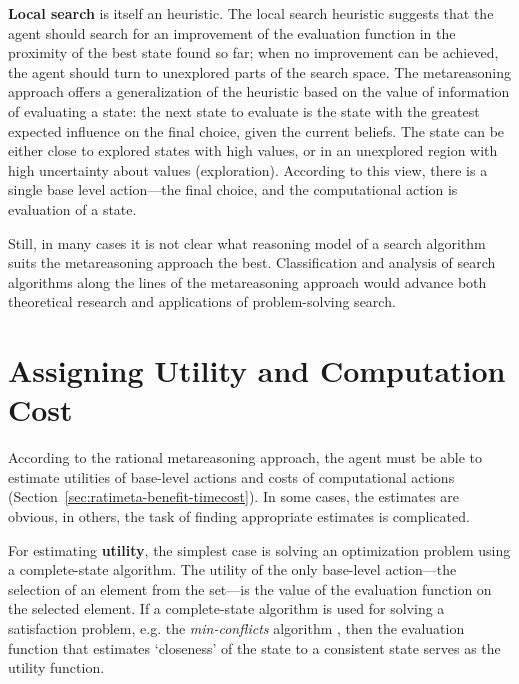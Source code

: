 {\bf Local search} is itself an heuristic. The local search heuristic
suggests that the agent should search for an improvement of the
evaluation function in the proximity of the best state found so far;
when no improvement can be achieved, the agent should turn to
unexplored parts of the search space. The metareasoning approach
offers a generalization of the heuristic based on the value of
information of evaluating a state: the next state to evaluate is the
state with the greatest expected influence on the final choice, given
the current beliefs. The state can be either close to explored
states with high values, or in an unexplored region with high
uncertainty about values (exploration). According to this view, there
is a single base level action---the final choice, and the computational
action is evaluation of a state.

Still, in many cases it is not clear what reasoning model of a search
algorithm suits the metareasoning approach the best. Classification
and analysis of search algorithms along the lines of the metareasoning
approach would advance both theoretical research and applications of
problem-solving search.

\section{Assigning Utility and Computation Cost}

According to the rational metareasoning approach, the agent must be
able to estimate utilities of base-level actions and costs of
computational actions
(Section~\ref{sec:ratimeta-benefit-timecost}). In some cases, the
estimates are obvious, in others, the task of finding appropriate
estimates is complicated.

For estimating {\bf utility}, the simplest case is solving an
optimization problem using a complete-state algorithm. The utility of
the only base-level action---the selection of an element from the
set---is the value of the evaluation function on the selected
element. If a complete-state algorithm is used for solving a
satisfaction problem, e.g. the {\em min-conflicts} algorithm
\cite{Russell.aima}, then the evaluation function that estimates
`closeness' of the state to a consistent state serves as the utility
function.


